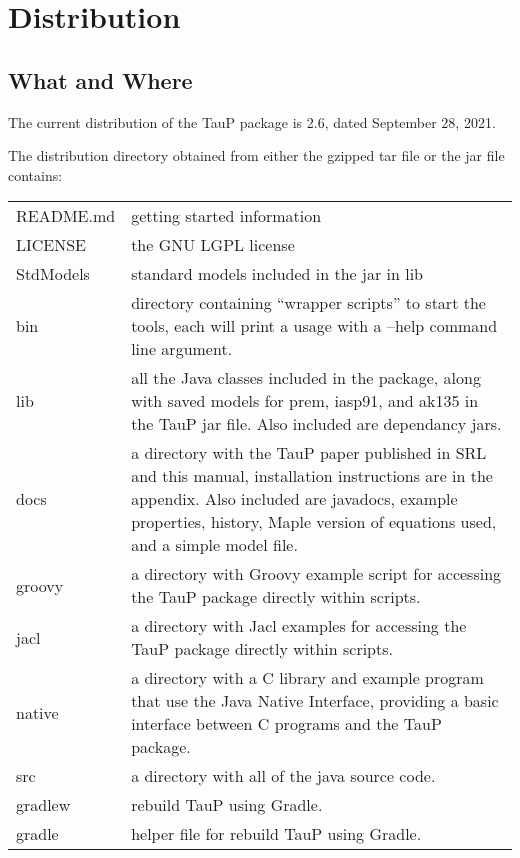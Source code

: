 
\section{Distribution}


\subsection{What and Where}
The current distribution of the TauP package is 2.6, dated September 28, 2021.

The distribution directory obtained from either the gzipped tar file or the jar file contains:

\begin{center}
\begin{tabular}{lp{4in}}
README.md & getting started information \\
LICENSE & the GNU LGPL license \\
StdModels & standard models included in the jar in lib \\
bin & directory containing ``wrapper scripts'' to start the tools,
   each will print a usage with a --help command line argument. \\
lib & all the Java classes included in the package, along with
               saved models for prem, iasp91, and ak135 in the TauP jar file.
               Also included are dependancy jars. \\
docs & a directory with the TauP paper published in SRL and this manual,
installation instructions are in the appendix. Also included are javadocs,
example properties, history, Maple version of equations used, and a simple model file.\\
groovy & a directory with Groovy example script for accessing the TauP package directly within scripts. \\
jacl & a directory with Jacl examples for accessing the TauP package directly within scripts. \\
native & a directory with a C library and example program that use the
Java Native Interface, providing a basic interface between C programs
and the TauP package. \\
src & a directory with all of the java source code. \\
gradlew & rebuild TauP using Gradle. \\
gradle & helper file for rebuild TauP using Gradle. \\
\end{tabular}
\end{center}

